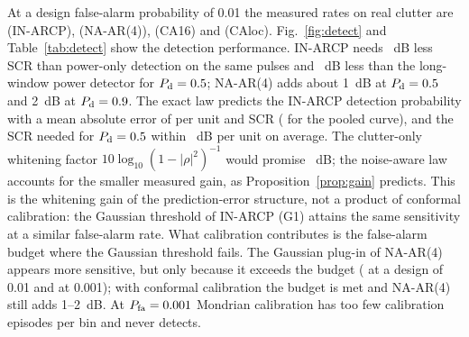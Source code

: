 \documentclass[journal]{IEEEtran}
\begin{document}
At a design false-alarm probability of 0.01 the measured rates on real clutter are \DetPfaINOne{} (IN-ARCP), \DetPfaNAFour{} (NA-AR(4)), \DetPfaCASixteen{} (CA16) and \DetPfaCAloc{} (CAloc). Fig.~\ref{fig:detect} and Table~\ref{tab:detect} show the detection performance. IN-ARCP needs \DetINGainCAHalf~dB less SCR than power-only detection on the same pulses and \DetINGainLocHalf~dB less than the long-window power detector for $P_{\rm d}=0.5$; NA-AR(4) adds about 1~dB at $P_{\rm d}=0.5$ and 2~dB at $P_{\rm d}=0.9$. The exact law predicts the IN-ARCP detection probability with a mean absolute error of \DetMae{} per unit and SCR (\DetMaePooled{} for the pooled curve), and the SCR needed for $P_{\rm d}=0.5$ within \DetScrErrAbs~dB per unit on average. The clutter-only whitening factor $10\log_{10}(1-|\rho|^2)^{-1}$ would promise \DetNaiveGain~dB; the noise-aware law accounts for the smaller measured gain, as Proposition~\ref{prop:gain} predicts. This is the whitening gain of the prediction-error structure, not a product of conformal calibration: the Gaussian threshold of IN-ARCP (G1) attains the same sensitivity at a similar false-alarm rate. What calibration contributes is the false-alarm budget where the Gaussian threshold fails. The Gaussian plug-in of NA-AR(4) appears more sensitive, but only because it exceeds the budget (\DetPfaNAFourG{} at a design of 0.01 and \DetPfaNAFourGmilli{} at 0.001); with conformal calibration the budget is met and NA-AR(4) still adds 1--2~dB. At $P_{\rm fa}=0.001$ Mondrian calibration has too few calibration episodes per bin and never detects.
\end{document}
